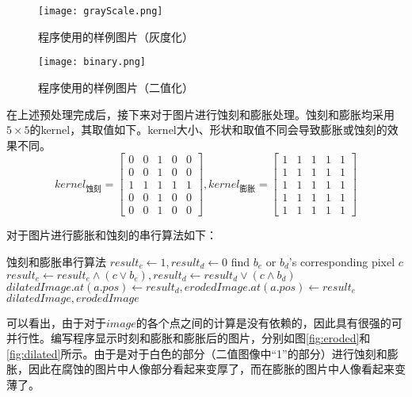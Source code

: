 \begin{figure}[htpb]
    \centering
    \begin{minipage}{0.45\linewidth}
        \centering
        \texttt{[image: grayScale.png]}
        \caption{程序使用的样例图片（灰度化）}
        \label{fig:grayScale}
    \end{minipage}
    \hfill
    \begin{minipage}{0.45\linewidth}
        \centering
        \texttt{[image: binary.png]}
        \caption{程序使用的样例图片（二值化）}
        \label{fig:binary}
    \end{minipage}
\end{figure}

\par 在上述预处理完成后，接下来对于图片进行蚀刻和膨胀处理。蚀刻和膨胀均采用\(5\times 5\)的kernel，其取值如下。kernel大小、形状和取值不同会导致膨胀或蚀刻的效果不同。
\[
    kernel_{\text{蚀刻}} =
    \begin{bmatrix}
        0 & 0 & 1 & 0 & 0 \\
        0 & 0 & 1 & 0 & 0 \\
        1 & 1 & 1 & 1 & 1 \\
        0 & 0 & 1 & 0 & 0 \\
        0 & 0 & 1 & 0 & 0
    \end{bmatrix}
    ,
    kernel_{\text{膨胀}} =
    \begin{bmatrix}
        1 & 1 & 1 & 1 & 1 \\
        1 & 1 & 1 & 1 & 1 \\
        1 & 1 & 1 & 1 & 1 \\
        1 & 1 & 1 & 1 & 1 \\
        1 & 1 & 1 & 1 & 1
    \end{bmatrix}
\]

\par 对于图片进行膨胀和蚀刻的串行算法如下：
\begin{simpleAlgorithm}{蚀刻和膨胀串行算法}
        \State \(result_e\leftarrow 1, result_d\leftarrow 0\)
        \State find \(b_e\) or \(b_d\)'s corresponding pixel \(c\)
            \State \(result_e\leftarrow result_e\wedge (c\vee b_e), result_d\leftarrow result_d \vee (c\wedge b_d)\)
        \EndFor
        \State \(dilatedImage.at(a.pos)\leftarrow result_d, erodedImage.at(a.pos)\leftarrow result_e\)
        \EndFor
        \State \Return \(dilatedImage, erodedImage\)
    \EndProcedure
\end{simpleAlgorithm}
\par 可以看出，由于对于\(image\)的各个点之间的计算是没有依赖的，因此具有很强的可并行性。编写程序显示时刻和膨胀和膨胀后的图片，分别如图\ref{fig:eroded}和\ref{fig:dilated}所示。由于是对于白色的部分（二值图像中``1''的部分）进行蚀刻和膨胀，因此在腐蚀的图片中人像部分看起来变厚了，而在膨胀的图片中人像看起来变薄了。

